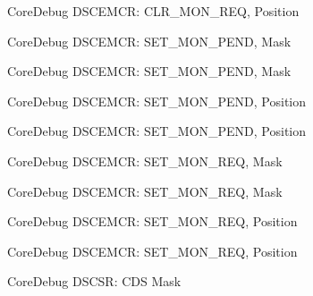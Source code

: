 \begin{DoxyRefList}
\label{deprecated__deprecated000522}%
%
Core\+Debug D\+S\+C\+E\+M\+CR\+: C\+L\+R\+\_\+\+M\+O\+N\+\_\+\+R\+EQ, Position  
\item[Member \mbox{\hyperlink{group__CMSIS__CoreDebug_ga575045239507b73f338bcbb959ac6904}{Core\+Debug\+\_\+\+D\+S\+C\+E\+M\+C\+R\+\_\+\+S\+E\+T\+\_\+\+M\+O\+N\+\_\+\+P\+E\+N\+D\+\_\+\+Msk}} ]\label{deprecated__deprecated000078}%
%
Core\+Debug D\+S\+C\+E\+M\+CR\+: S\+E\+T\+\_\+\+M\+O\+N\+\_\+\+P\+E\+ND, Mask 

\label{deprecated__deprecated000529}%
%
Core\+Debug D\+S\+C\+E\+M\+CR\+: S\+E\+T\+\_\+\+M\+O\+N\+\_\+\+P\+E\+ND, Mask  
\item[Member \mbox{\hyperlink{group__CMSIS__CoreDebug_ga644ae3a13bcb9f2a80326bc5824f1b28}{Core\+Debug\+\_\+\+D\+S\+C\+E\+M\+C\+R\+\_\+\+S\+E\+T\+\_\+\+M\+O\+N\+\_\+\+P\+E\+N\+D\+\_\+\+Pos}} ]\label{deprecated__deprecated000077}%
%
Core\+Debug D\+S\+C\+E\+M\+CR\+: S\+E\+T\+\_\+\+M\+O\+N\+\_\+\+P\+E\+ND, Position 

\label{deprecated__deprecated000528}%
%
Core\+Debug D\+S\+C\+E\+M\+CR\+: S\+E\+T\+\_\+\+M\+O\+N\+\_\+\+P\+E\+ND, Position  
\item[Member \mbox{\hyperlink{group__CMSIS__CoreDebug_ga73d8960abbd67eeda64f27a77ed7baf2}{Core\+Debug\+\_\+\+D\+S\+C\+E\+M\+C\+R\+\_\+\+S\+E\+T\+\_\+\+M\+O\+N\+\_\+\+R\+E\+Q\+\_\+\+Msk}} ]\label{deprecated__deprecated000076}%
%
Core\+Debug D\+S\+C\+E\+M\+CR\+: S\+E\+T\+\_\+\+M\+O\+N\+\_\+\+R\+EQ, Mask 

\label{deprecated__deprecated000527}%
%
Core\+Debug D\+S\+C\+E\+M\+CR\+: S\+E\+T\+\_\+\+M\+O\+N\+\_\+\+R\+EQ, Mask  
\item[Member \mbox{\hyperlink{group__CMSIS__CoreDebug_ga77f02a6d773fa2c6daafbbdd7df2d9d2}{Core\+Debug\+\_\+\+D\+S\+C\+E\+M\+C\+R\+\_\+\+S\+E\+T\+\_\+\+M\+O\+N\+\_\+\+R\+E\+Q\+\_\+\+Pos}} ]\label{deprecated__deprecated000075}%
%
Core\+Debug D\+S\+C\+E\+M\+CR\+: S\+E\+T\+\_\+\+M\+O\+N\+\_\+\+R\+EQ, Position 

\label{deprecated__deprecated000526}%
%
Core\+Debug D\+S\+C\+E\+M\+CR\+: S\+E\+T\+\_\+\+M\+O\+N\+\_\+\+R\+EQ, Position  
\item[Member \mbox{\hyperlink{group__CMSIS__CoreDebug_ga083417245e1aa40e84a2b12433a15a6b}{Core\+Debug\+\_\+\+D\+S\+C\+S\+R\+\_\+\+C\+D\+S\+\_\+\+Msk}} ]\label{deprecated__deprecated000094}%
%
Core\+Debug D\+S\+C\+SR\+: C\+DS Mask 


\end{DoxyRefList}
